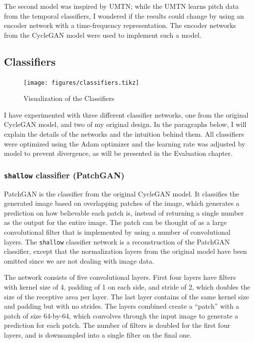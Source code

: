 \documentclass[12pt,a4paper,]{report}
\begin{document}
The second model was inspired by UMTN; while the UMTN learns pitch data
from the temporal classifiers, I wondered if the results could change by
using an encoder network with a time-frequency representation. The
encoder networks from the CycleGAN model were used to implement such a
model.

\hypertarget{classifiers}{%
\subsection{Classifiers}\label{classifiers}}

\begin{figure}
    \texttt{[image: figures/classifiers.tikz]}
    \centering
    \caption{Visualization of the Classifiers}
\end{figure}

I have experimented with three different classifier networks, one from
the original CycleGAN model, and two of my original design. In the
paragraphs below, I will explain the details of the networks and the
intuition behind them. All classifiers were optimized using the Adam
optimizer and the learning rate was adjusted by model to prevent
divergence, as will be presented in the Evaluation chapter.

\hypertarget{shallow-classifier-patchgan}{%
\subsubsection{\texorpdfstring{\texttt{shallow} classifier
(PatchGAN)}{shallow classifier (PatchGAN)}}\label{shallow-classifier-patchgan}}

PatchGAN is the classifier from the original CycleGAN model. It
classifies the generated image based on overlapping patches of the
image, which generates a prediction on how believable each patch is,
instead of returning a single number as the output for the entire image.
The patch can be thought of as a large convolutional filter that is
implemented by using a number of convolutional layers. The
\texttt{shallow} classifier network is a reconstruction of the PatchGAN
classifier, except that the normalization layers from the original model
have been omitted since we are not dealing with image data.

The network consists of five convolutional layers. First four layers
have filters with kernel size of 4, padding of 1 on each side, and
stride of 2, which doubles the size of the receptive area per layer. The
last layer contains of the same kernel size and padding but with no
strides. The layers combined create a ``patch'' with a patch of size
64-by-64, which convolves through the input image to generate a
prediction for each patch. The number of filters is doubled for the
first four layers, and is downsampled into a single filter on the final
one.
\end{document}
